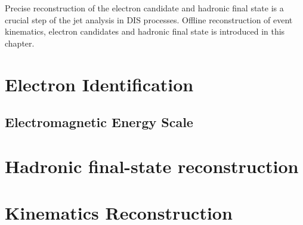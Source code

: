 Precise reconstruction of the electron candidate and hadronic final state is a crucial step of the jet analysis in DIS processes. 
Offline reconstruction of event kinematics, electron candidates and hadronic final state is introduced in this chapter.

\section{Electron Identification}
\label{sec:eleid}


\subsection{Electromagnetic Energy Scale}
\label{subsec:eleenescale}


\section{Hadronic final-state reconstruction}
\label{sec:hadronreco}


\section{Kinematics Reconstruction}
\label{sec:kinrec}



